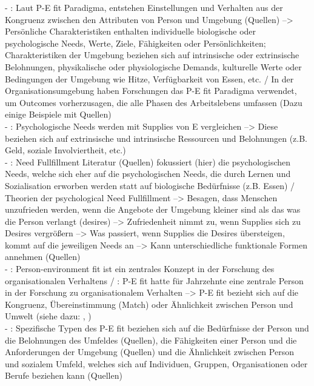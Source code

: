 - \cite[S. 1]{edwards:2004}: Laut P-E fit Paradigma, entstehen Einstellungen und Verhalten aus der Kongruenz zwischen den Attributen von Person und Umgebung (Quellen) --> Persönliche Charakteristiken enthalten individuelle biologische oder psychologische Needs, Werte, Ziele, Fähigkeiten oder Persönlichkeiten; Charakteristiken der Umgebung beziehen sich auf intrinsische oder extrinsische Belohnungen, physikalische oder physiologische Demands, kulturelle Werte oder Bedingungen der Umgebung wie Hitze, Verfügbarkeit von Essen, etc. / In der Organisationsumgebung haben Forschungen das P-E fit Paradigma verwendet, um Outcomes vorherzusagen, die alle Phasen des Arbeitslebens umfassen (Dazu einige Beispiele mit Quellen) \\
- \cite[S. 2]{edwards:2004}: Psychologische Needs werden mit Supplies von E vergleichen --> Diese beziehen sich auf extrinsische und intrinsische Ressourcen und Belohnungen (z.B. Geld, soziale Involviertheit, etc.) \\
- \cite[S. 2]{edwards:2004}: Need Fullfillment Literatur (Quellen) fokussiert (hier) die psychologischen Needs, welche sich eher auf die psychologischen Needs, die durch Lernen und Sozialisation erworben werden statt auf biologische Bedürfnisse (z.B. Essen) / Theorien der psychological Need Fullfillment --> Besagen, dass Menschen unzufrieden werden, wenn die Angebote der Umgebung kleiner sind als das was die Person verlangt (desires) --> Zufriedenheit nimmt zu, wenn Supplies sich zu Desires vergrößern --> Was passiert, wenn Supplies die Desires übersteigen, kommt auf die jeweiligen Needs an --> Kann unterschiedliche funktionale Formen annehmen (Quellen)\\
- \cite[S. 1]{edwards:2008}: Person-environment fit ist ein zentrales Konzept in der Forschung des organisationalen Verhaltens / \cite[S. 2]{edwards:2008}: P-E fit hatte für Jahrzehnte eine zentrale Person in der Forschung zu organisationalem Verhalten --> P-E fit bezieht sich auf die Kongruenz, Übereinstimmung (Match) oder Ähnlichkeit zwischen Person und Umwelt (siehe dazu: \cite{edwards:1998}, \cite{muchinsky:1987})\\
- \cite[S. 2]{edwards:2008}: Spezifische Typen des P-E fit beziehen sich auf die Bedürfnisse der Person und die Belohnungen des Umfeldes (Quellen), die Fähigkeiten einer Person und die Anforderungen der Umgebung (Quellen) und die Ähnlichkeit zwischen Person und sozialem Umfeld, welches sich auf Individuen, Gruppen, Organisationen oder Berufe beziehen kann (Quellen) \\
